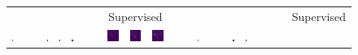 \begin{figure}
\centering
\setlength{\tabcolsep}{0.5pt}
\begin{tabular}{c cc ccc cc ccc cc c cc ccc cc ccc}
	&&& \multicolumn{3}{c}{\OURS} &&& \multicolumn{3}{c}{Supervised} &&& &&& \multicolumn{3}{c}{\OURS} &&& \multicolumn{3}{c}{Supervised} \\
    \cmidrule{4-6}
    \cmidrule{9-11}
    \cmidrule{17-19}
    \cmidrule{22-24}
\includegraphics[width=0.07\linewidth]{3478.png} &&&
\includegraphics[width=0.07\linewidth]{3478dino-depth12-head2.png} &
\includegraphics[width=0.07\linewidth]{3478dino-depth12-head0.png} &
\includegraphics[width=0.07\linewidth]{3478dino-depth12-head5.png} &&&
\includegraphics[width=0.07\linewidth]{3478sup-depth12-head0.png} &
\includegraphics[width=0.07\linewidth]{3478sup-depth12-head1.png} &
\includegraphics[width=0.07\linewidth]{3478sup-depth12-head2.png}
&&&
\includegraphics[width=0.07\linewidth]{944.png} &&&
\includegraphics[width=0.07\linewidth]{944dino-depth12-head0.png} &
\includegraphics[width=0.07\linewidth]{944dino-depth12-head2.png} &

\end{tabular}
\end{figure}
